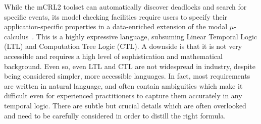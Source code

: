 \documentclass[letter]{llncs}
\newcommand{\figshrink}{\vspace{-.6cm}}
\newcommand{\figshrinkend}{}
\begin{document}

While the mCRL2 toolset can automatically discover deadlocks and search
for specific events, its model checking facilities require users to
specify their application-specific properties in a data-enriched extension
of the modal $\mu$-calculus~\cite{Groote05model-checkingprocesses}. 
This is a highly expressive language, subsuming Linear Temporal Logic
(LTL) and Computation Tree Logic (CTL). A downside is that
it is not very accessible and
requires a high level of sophistication and mathematical background.
Even so, even LTL and CTL are not widespread in industry, despite being
considered simpler, more accessible languages. In fact, most requirements
are written in natural language, and often contain ambiguities which
make it difficult even for experienced practitioners to capture them
accurately in any temporal logic. There are subtle but crucial details
which are often overlooked and need to be carefully considered in order
to distill the right formula.



\end{document}
